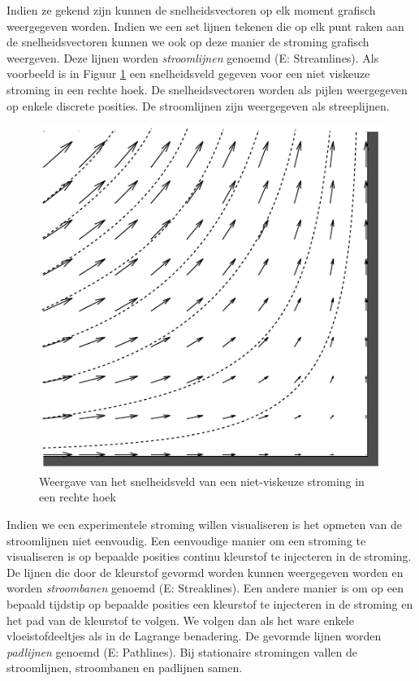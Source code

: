 Indien ze gekend zijn kunnen de snelheidsvectoren op elk moment grafisch weergegeven worden. Indien we een set lijnen tekenen die op elk punt raken aan de snelheidsvectoren kunnen we ook op deze manier de stroming grafisch weergeven. Deze lijnen worden \emph{stroomlijnen} genoemd (E: Streamlines). Als voorbeeld is in Figuur \ref{fig:snelheidsveld} een snelheidsveld gegeven voor een niet viskeuze stroming in een rechte hoek. De snelheidsvectoren worden als pijlen weergegeven op enkele discrete posities. De stroomlijnen zijn weergegeven als streeplijnen.
\begin{figure}[htb]
	\centering
	\includegraphics{fig/basisbegrippen/Snelheidsveld}
	\caption{Weergave van het snelheidsveld van een niet-viskeuze stroming in een rechte hoek}
	\label{fig:snelheidsveld}
\end{figure}
Indien we een experimentele stroming willen visualiseren is het opmeten van de stroomlijnen niet eenvoudig. Een eenvoudige manier om een stroming te visualiseren is op bepaalde posities continu kleurstof te injecteren in de stroming. De lijnen die door de kleurstof gevormd worden kunnen weergegeven worden en worden \emph{stroombanen} genoemd (E: Streaklines).
Een andere manier is om op een bepaald tijdstip op bepaalde posities een kleurstof te injecteren in de stroming en het pad van de kleurstof te volgen. We volgen dan als het ware enkele vloeistofdeeltjes als in de Lagrange benadering. De gevormde lijnen worden \emph{padlijnen} genoemd (E: Pathlines).
Bij stationaire stromingen vallen de stroomlijnen, stroombanen en padlijnen samen.


